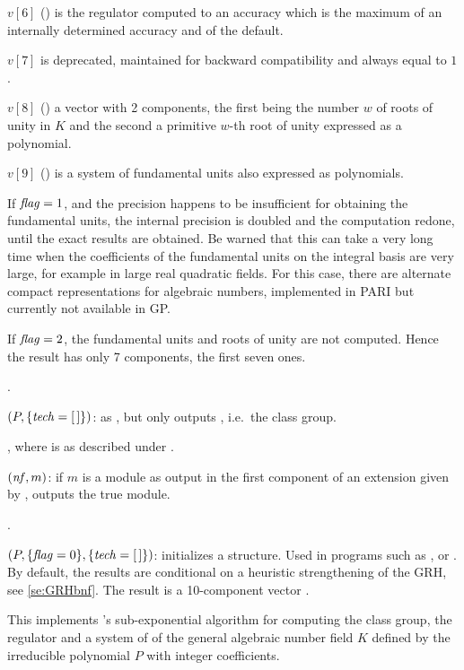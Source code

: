  $v[6]$ () is the regulator computed to an accuracy which is the
maximum of an internally determined accuracy and of the default.

 $v[7]$ is deprecated, maintained for backward compatibility and always equal
to $1$.

 $v[8]$ () a vector with 2 components, the first being the number
$w$ of roots of unity in $K$ and the second a primitive $w$-th root of unity
expressed as a polynomial.

 $v[9]$ () is a system of fundamental units also expressed as
polynomials.

If $\hbox{\it f\kern0pt lag\/}=1$, and the precision happens to be insufficient for obtaining the
fundamental units, the internal precision is doubled and the computation
redone, until the exact results are obtained. Be warned that this can take a
very long time when the coefficients of the fundamental units on the integral
basis are very large, for example in large real quadratic fields.
For this case, there are alternate compact representations for algebraic
numbers, implemented in PARI but currently not available in GP.

If $\hbox{\it f\kern0pt lag\/}=2$, the fundamental units and roots of unity are not computed.
Hence the result has only 7 components, the first seven ones.

.

$(P,\{\hbox{\it tech\/}=[\,]\})$: as , but only
outputs , i.e.~the class group.

, where 
is as described under .

$(\hbox{\it nf\/},m)$: if $m$ is a module as output in the
first component of an extension given by , outputs the
true module.

.

$(P,\{\hbox{\it f\kern0pt lag\/}=0\},\{\hbox{\it tech\/}=[\,]\})$: initializes a
 structure. Used in programs such as ,
 or . By default, the results are conditional
on a heuristic strengthening of the GRH, see \ref{se:GRHbnf}. The result is a
10-component vector .

This implements 's sub-exponential algorithm for computing the
class group, the regulator and a system of  of the
general algebraic number field $K$ defined by the irreducible polynomial $P$
with integer coefficients.

